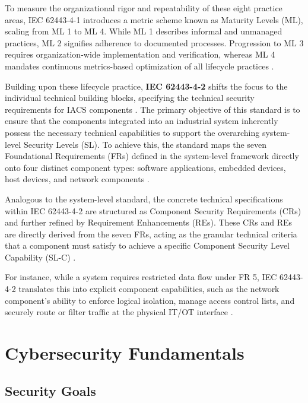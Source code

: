 To measure the organizational rigor and repeatability of these eight practice areas, IEC 62443-4-1 introduces a metric scheme known as Maturity Levels (ML), scaling from ML 1 to ML 4. While ML 1 describes informal and unmanaged practices, ML 2 signifies adherence to documented processes. Progression to ML 3 requires organization-wide implementation and verification, whereas ML 4 mandates continuous metrics-based optimization of all lifecycle practices \cite[pection 4.2]{DIN_EN_IEC_62443_4_1_2018}.

Building upon these lifecycle practice, \textbf{IEC 62443-4-2} shifts the focus to the individual technical building blocks, specifying the technical security requirements for IACS components \cite[p. 18]{IEC62443-4-2}. The primary objective of this standard is to ensure that the components integrated into an industrial system inherently possess the necessary technical capabilities to support the overarching system-level Security Levels (SL). 
To achieve this, the standard maps the seven Foundational Requirements (FRs) defined in the system-level framework directly onto four distinct component types: software applications, embedded devices, host 
devices, and network components \cite[p. 17]{IEC62443-4-2}. 

Analogous to the system-level standard, the concrete technical specifications within IEC 62443-4-2 are structured as Component Security Requirements (CRs) and further refined by Requirement Enhancements (REs)\cite[pp. 32]{IEC62443-4-2}. These CRs and REs are directly derived from the seven FRs, acting as the granular technical criteria that a component must satisfy to achieve a specific Component Security Level Capability (SL-C) \cite[pp. 31]{IEC62443-4-2}. 

For instance, while a system requires restricted data flow under FR 5, IEC 62443-4-2 translates this into explicit component capabilities, such as the network component's ability to enforce logical isolation, manage access control lists, and securely route or filter traffic at the physical IT/OT interface 
\cite[pp. 61]{IEC62443-4-2}. 

\section{Cybersecurity Fundamentals} 
\label{sec:cybersecurity_fundamentals} 



\subsection{Security Goals} 
\label{subsec:security_goals} 


